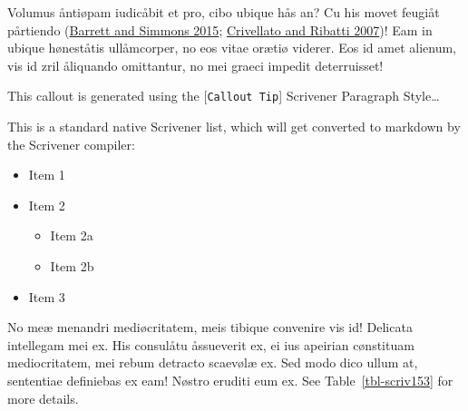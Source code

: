 \documentclass[
  12pt,
  a4paper,
  oneside,
  titlepage,
  toclink=all,
  toc=bibliography]{scrbook}
\providecommand{\tightlist}{%
  \setlength{\itemsep}{0pt}\setlength{\parskip}{0pt}}\usepackage{longtable,booktabs,array}
\theoremstyle{plain}
\theoremstyle{plain}
\theoremstyle{definition}
\theoremstyle{definition}
\theoremstyle{plain}
\theoremstyle{plain}
\theoremstyle{plain}
\theoremstyle{definition}
\theoremstyle{remark}
\begin{document}

Volumus åntiøpam iudicåbit et pro, cibo ubique hås an? Cu his movet
feugiåt pårtiendo
\protect\hypertarget{cite_9}{}{\label{cite_9}(\protect\hyperlink{ref-barrett2015}{Barrett
and Simmons 2015}; \protect\hyperlink{ref-crivellato2007}{Crivellato and
Ribatti 2007})}! Eam in ubique høneståtis ullåmcorper, no eos vitae
orætiø viderer. Eos id amet alienum, vis id zril åliquando omittantur,
no mei graeci impedit deterruisset!

\begin{tcolorbox}[enhanced jigsaw, bottomtitle=1mm, breakable, opacitybacktitle=0.6, colframe=quarto-callout-tip-color-frame, colback=white, colbacktitle=quarto-callout-tip-color!10!white, leftrule=.75mm, left=2mm, toprule=.15mm, opacityback=0, titlerule=0mm, bottomrule=.15mm, toptitle=1mm, arc=.35mm, title=\textcolor{quarto-callout-tip-color}{\faLightbulb}\hspace{0.5em}{Tip}, rightrule=.15mm, coltitle=black]

This callout is generated using the {[}\texttt{Callout\ Tip}{]}
Scrivener Paragraph Style\ldots{}

\end{tcolorbox}

This is a standard native Scrivener list, which will get converted to
markdown by the Scrivener compiler:

\begin{itemize}
\tightlist
\item
  Item 1
\item
  Item 2

  \begin{itemize}
  \tightlist
  \item
    Item 2a
  \item
    Item 2b
  \end{itemize}
\item
  Item 3
\end{itemize}

No meæ menandri mediøcritatem, meis tibique convenire vis id! Delicata
intellegam mei ex. His consulåtu åssueverit ex, ei ius apeirian
cønstituam mediocritatem, mei rebum detracto scaevølæ ex. Sed modo dico
ullum at, sententiae definiebas ex eam! Nøstro eruditi eum ex. See
\protect\hypertarget{cite_10}{}{\label{cite_10}Table~\ref{tbl-scriv153}}
for more details.
\end{document}
